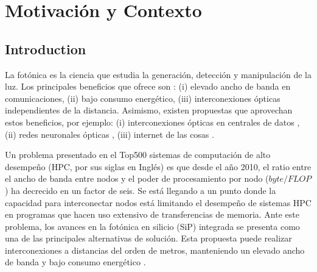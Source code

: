 \chapter{Motivación y Contexto}

\section{Introduction}

La fotónica es la ciencia que estudia la generación, detección y manipulación de la luz. 
Los principales beneficios que ofrece son \citep{Shen2019}:
(i) elevado ancho de banda en comunicaciones, 
(ii) bajo consumo energético,
(iii) interconexiones ópticas independientes de la distancia.
Asimismo, existen propuestas que aprovechan estos beneficios, por ejemplo:
(i) interconexiones ópticas en centrales de datos \citep{Shen2019}, %
(ii) redes neuronales ópticas \citep{Shen2017}, %
(iii) internet de las cosas \citep{Li2021}.



Un problema presentado en el Top500 sistemas de computación de alto desempeño (HPC, por sus siglas en Inglés) es que desde el año 2010, 
el ratio entre el ancho de banda entre nodos y el poder de procesamiento por nodo ($byte / FLOP$) ha decrecido en un factor de seis.
Se está llegando a un punto donde la capacidad para interconectar nodos está
limitando el desempeño de sistemas HPC en programas que hacen uso extensivo de transferencias de memoria.
Ante este problema, los avances en la fotónica en silicio (SiP) integrada se presenta como una de las principales alternativas de solución. 
Esta propuesta puede realizar interconexiones a distancias del orden de metros,
manteniendo un elevado ancho de banda y bajo consumo energético \citep{Shen2019, Anderson2018}.

